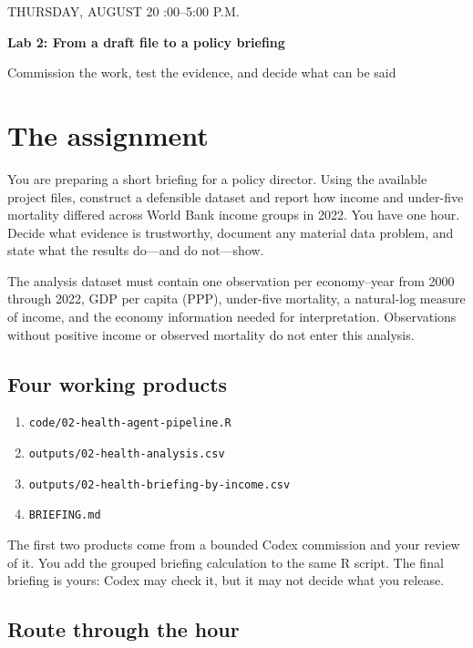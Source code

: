 \documentclass[11pt]{article}
\newcommand{\file}[1]{\nolinkurl{#1}}
\begin{document}
\begin{center}
  {\small THURSDAY, AUGUST 20 :00--5:00 P.M.}\par
  \vspace{0.6em}
  {\LARGE\textbf{Lab 2: From a draft file to a policy briefing}}\par
  \vspace{0.45em}
  {\large Commission the work, test the evidence, and decide what can be said}
\end{center}

\section*{The assignment}

You are preparing a short briefing for a policy director. Using the available
project files, construct a defensible dataset and report how income and
under-five mortality differed across World Bank income groups in 2022. You have
one hour. Decide what evidence is trustworthy, document any material data
problem, and state what the results do---and do not---show.

The analysis dataset must contain one observation per economy--year from 2000
through 2022, GDP per capita (PPP), under-five mortality, a natural-log measure
of income, and the economy information needed for interpretation. Observations
without positive income or observed mortality do not enter this analysis.

\subsection*{Four working products}

\begin{enumerate}
  \item \file{code/02-health-agent-pipeline.R}
  \item \file{outputs/02-health-analysis.csv}
  \item \file{outputs/02-health-briefing-by-income.csv}
  \item \file{BRIEFING.md}
\end{enumerate}

The first two products come from a bounded Codex commission and your review of
it. You add the grouped briefing calculation to the same R script. The final
briefing is yours: Codex may check it, but it may not decide what you release.

\subsection*{Route through the hour}
\end{document}
